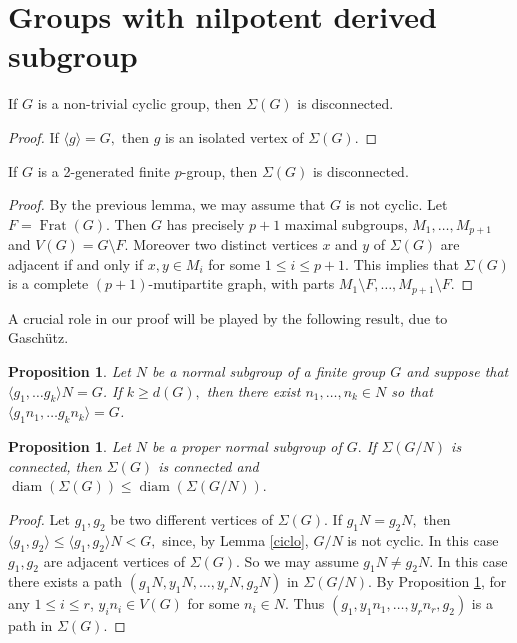\documentclass{amsart}
\DeclareMathOperator{\frat}{Frat}
\DeclareMathOperator{\diam}{diam}
\newtheorem{prop}[thm]{Proposition} \newtheorem{rem}[thm]{Remark}
\numberwithin{equation}{section}
\begin{document}
\section{Groups with nilpotent derived subgroup}\label{ultimasec}

\begin{lemma}\label{ciclo}
If $G$ is a non-trivial cyclic group, then $\Sigma(G)$ is disconnected.
\end{lemma}
\begin{proof}
If $\langle g \rangle=G,$ then $g$ is an isolated vertex of $\Sigma(G).$
\end{proof}

\begin{lemma}\label{pgruppo}
If $G$ is a 2-generated finite $p$-group, then $\Sigma(G)$ is disconnected.
\end{lemma}
\begin{proof}
By the previous lemma, we may assume that $G$ is not cyclic. Let $F=\frat(G)$. Then $G$ has precisely $p+1$ maximal subgroups,
$M_1,\dots,M_{p+1}$ and $V(G)=G\setminus F.$
Moreover two distinct vertices $x$ and $y$ of $\Sigma(G)$ are adjacent if and only if
$x, y \in M_i$ for some $1\leq i \leq p+1.$
This implies that $\Sigma(G)$ is a complete $(p+1)$-mutipartite graph, with parts $M_1\setminus F,\dots,M_{p+1}\setminus F.$ 
\end{proof}

A crucial role in our proof will be played by the following result, due to Gasch\"utz.
\begin{prop}\cite{Ga}\label{gaz}
	Let $N$ be a normal
	subgroup of a finite group $G$ and suppose that $\langle g_1,\dots g_k\rangle N=G$. If $k \geq d(G),$ then there
	exist $n_1,\dots,n_k \in N$ so that $\langle g_1n_1,\dots g_kn_k\rangle=G$.
\end{prop}

\begin{prop}\label{quoz}
Let $N$ be a proper normal subgroup of $G.$ If $\Sigma(G/N)$ is connected, then $\Sigma(G)$ is connected and $\diam(\Sigma(G))\leq \diam(\Sigma(G/N)).$
\end{prop}
\begin{proof}
 Let $g_1,g_2$ be two different vertices of $\Sigma(G).$ If $g_1N=g_2N,$ then
$\langle g_1, g_2 \rangle \leq \langle g_1, g_2\rangle N < G,$ since, by Lemma \ref{ciclo}, $G/N$ is not cyclic. In this case $g_1,g_2$ are adjacent vertices of $\Sigma(G).$ So we may assume $g_1N\neq g_2N.$ In this case there exists a path $(g_1N,y_1N,\dots,y_rN,g_2N)$ in $\Sigma(G/N).$ By Proposition \ref{gaz}, for any $1\leq i\leq r$, $y_in_i \in V(G)$ for some $n_i \in N.$ Thus $(g_1,y_1n_1,\dots,y_rn_r,g_2)$ is a path in $\Sigma(G).$
\end{proof}
\end{document}

